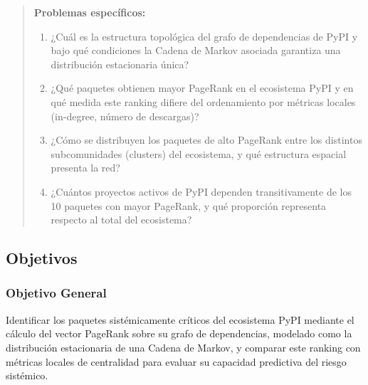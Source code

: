 \begin{quote}
\textbf{Problemas específicos:}
\begin{enumerate}[label=\textbf{PE\arabic*.}]
    \item ¿Cuál es la estructura topológica del grafo de dependencias de PyPI y bajo
          qué condiciones la Cadena de Markov asociada garantiza una distribución
          estacionaria única?
    \item ¿Qué paquetes obtienen mayor PageRank en el ecosistema PyPI y en qué medida
          este ranking difiere del ordenamiento por métricas locales (in-degree,
          número de descargas)?
    \item ¿Cómo se distribuyen los paquetes de alto PageRank entre los distintos
          subcomunidades (clusters) del ecosistema, y qué estructura espacial
          presenta la red?
    \item ¿Cuántos proyectos activos de PyPI dependen transitivamente de los
          10 paquetes con mayor PageRank, y qué proporción representa respecto
          al total del ecosistema?
\end{enumerate}
\end{quote}

\subsection{Objetivos}

\subsubsection{Objetivo General}
Identificar los paquetes sistémicamente críticos del ecosistema PyPI mediante el
cálculo del vector PageRank sobre su grafo de dependencias, modelado como la
distribución estacionaria de una Cadena de Markov, y comparar este ranking con
métricas locales de centralidad para evaluar su capacidad predictiva del riesgo
sistémico.

